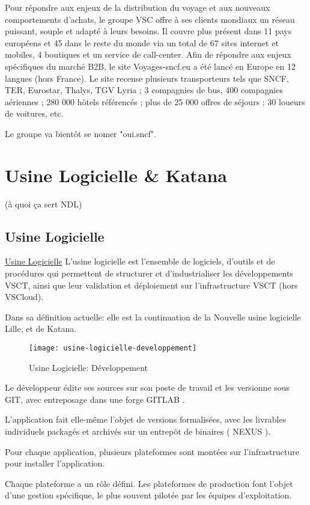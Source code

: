 Pour répondre aux enjeux de la distribution du voyage et aux nouveaux comportements d’achats, le groupe VSC offre à ses clients mondiaux un réseau puissant, souple et adapté à leurs besoins. Il couvre plus présent dans 11 pays européens et 45 dans le reste du monde via un total de 67 sites internet et mobiles, 4 boutiques et un service de call-center. Afin de répondre aux enjeux spécifiques du marché B2B, le site Voyages-sncf.eu a été lancé en Europe en 12 langues (hors France).
Le site recense plusieurs transporteurs tels que SNCF, TER, Eurostar, Thalys, TGV Lyria ; 3 compagnies de bus, 400 compagnies aériennes ; 280 000 hôtels référencés ; plus de 25 000 offres de séjours ; 30 loueurs de voitures, etc.

Le groupe va bientôt se nomer "oui.sncf".
\clearpage

\section{Usine Logicielle \& Katana} (à quoi ça sert NDL)
\subsection{Usine Logicielle}
\href{https://wiki.vsct.fr/pages/viewpage.action?spaceKey=KTN\&title=Usine+Logicielle+VSCT}{Usine Logicielle}
L'usine logicielle est l'ensemble de logiciels, d'outils et de procédures qui permettent de structurer et d'industrialiser les développements VSCT, ainsi que leur validation et déploiement sur l'infrastructure VSCT (hors VSCloud).

Dans sa définition actuelle: elle est la continuation de la Nouvelle usine logicielle Lille, et de Katana.

\begin{figure}[h]
\centering
\texttt{[image: usine-logicielle-developpement]}
\caption{Usine Logicielle: Développement}
\end{figure}

Le développeur édite ses sources sur son poste de travail et les versionne sous GIT, avec entreposage dans une forge GITLAB .

L'application fait elle-même l'objet de versions formalisées, avec les livrables individuels packagés et archivés sur un entrepôt de binaires ( NEXUS ).

Pour chaque application, plusieurs plateformes sont montées sur l'infrastructure pour installer l'application.

Chaque plateforme a un rôle défini. Les plateformes de production font l'objet d'une gestion spécifique, le plus souvent pilotée par les équipes d'exploitation.

